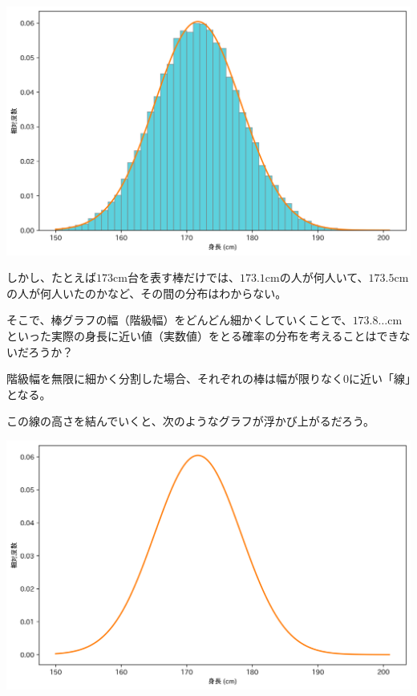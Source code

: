 \documentclass[../../../topic_statistics]{subfiles}
\begin{document}
\br

\includegraphics[width=0.95\linewidth]{./python/sampling-height_discrete.png}

\br

しかし、たとえば$173$cm台を表す棒だけでは、$173.1$cmの人が何人いて、$173.5$cmの人が何人いたのかなど、その間の分布はわからない。

\br

そこで、棒グラフの幅（階級幅）をどんどん細かくしていくことで、$173.8\dots$cmといった実際の身長に近い値（実数値）をとる確率の分布を考えることはできないだろうか？

\br

階級幅を無限に細かく分割した場合、それぞれの棒は幅が限りなく$0$に近い「線」となる。

この線の高さを結んでいくと、次のようなグラフが浮かび上がるだろう。

\br

\includegraphics[width=0.95\linewidth]{./python/sampling-height_continuous.png}

\br
\end{document}
